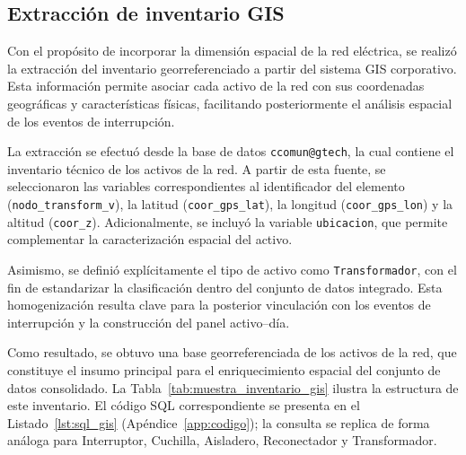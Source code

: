 \subsection{Extracción de inventario GIS}
\label{sec:extraccion_gis}
Con el propósito de incorporar la dimensión espacial de la red eléctrica, se realizó la extracción del inventario georreferenciado a partir del sistema GIS corporativo. Esta información permite asociar cada activo de la red con sus coordenadas geográficas y características físicas, facilitando posteriormente el análisis espacial de los eventos de interrupción.

La extracción se efectuó desde la base de datos \texttt{ccomun@gtech}, la cual contiene el inventario técnico de los activos de la red. A partir de esta fuente, se seleccionaron las variables correspondientes al identificador del elemento (\texttt{nodo\_transform\_v}), la latitud (\texttt{coor\_gps\_lat}), la longitud (\texttt{coor\_gps\_lon}) y la altitud (\texttt{coor\_z}). Adicionalmente, se incluyó la variable \texttt{ubicacion}, que permite complementar la caracterización espacial del activo.

Asimismo, se definió explícitamente el tipo de activo como \texttt{Transformador}, con el fin de estandarizar la clasificación dentro del conjunto de datos integrado. Esta homogenización resulta clave para la posterior vinculación con los eventos de interrupción y la construcción del panel activo–día.

    Como resultado, se obtuvo una base georreferenciada de los activos de la red, que constituye el insumo principal para el enriquecimiento espacial del conjunto de datos consolidado. La Tabla~\ref{tab:muestra_inventario_gis} ilustra la estructura de este inventario. El código SQL correspondiente se presenta en el Listado~\ref{lst:sql_gis} (Apéndice~\ref{app:codigo}); la consulta se replica de forma análoga para Interruptor, Cuchilla, Aisladero, Reconectador y Transformador.
    
